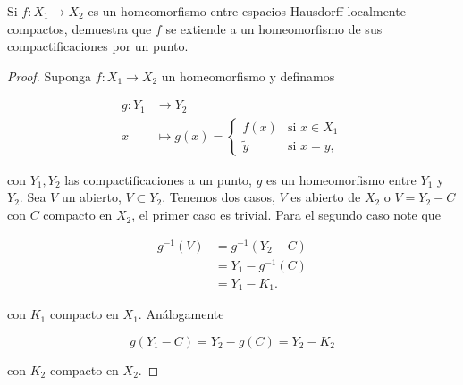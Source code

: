 
\item Si $f: X_1 \rightarrow X_2$ es un homeomorfismo entre espacios Hausdorff localmente compactos, demuestra que $f$ se extiende a un homeomorfismo de sus compactificaciones por un punto.

\begin{proof}
    Suponga $f:X_1\to X_2$ un homeomorfismo y definamos

    \begin{align*}
        g : Y_1 &\longrightarrow Y_2 \\
        x &\longmapsto g(x) = \begin{cases}
            f(x) &\text{si } x\in X_1\\
            \tilde{y} &\text{si }x=y,
        \end{cases}
    \end{align*}

    con $Y_1, Y_2$ las compactificaciones a un punto, $g$ es un homeomorfismo entre $Y_1$ y $Y_2$. Sea $V$ un abierto, $V\subset Y_2$. Tenemos dos casos, $V$ es abierto de $X_2$ o $V=Y_2-C$ con $C$ compacto en $X_2$, el primer caso es trivial. Para el segundo caso note que 

    \begin{align*}
        g^{-1}(V)&=g^{-1}(Y_2-C)\\
        &=Y_1-g^{-1}(C)\\
        &=Y_1- K_1
    .\end{align*}

    con $K_1$ compacto en $X_1$. Análogamente 

    $$g(Y_1-C)=Y_2-g(C)=Y_2-K_2$$

    con $K_2$ compacto en $X_2$.
        
\end{proof}